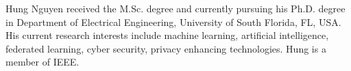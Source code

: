 \documentclass[journal]{IEEEtai}
\begin{document}
\begin{IEEEbiography}{Hung Nguyen}
	received the M.Sc. degree and currently pursuing his Ph.D. degree in Department of Electrical Engineering, University of South Florida, FL, USA. His current research interests include machine learning, artificial intelligence, federated learning, cyber security, privacy enhancing technologies. Hung is a member of IEEE.
\end{IEEEbiography}

%
%



\newpage
\appendices


\newpage


\newpage

\newpage


\newpage

\end{document}

